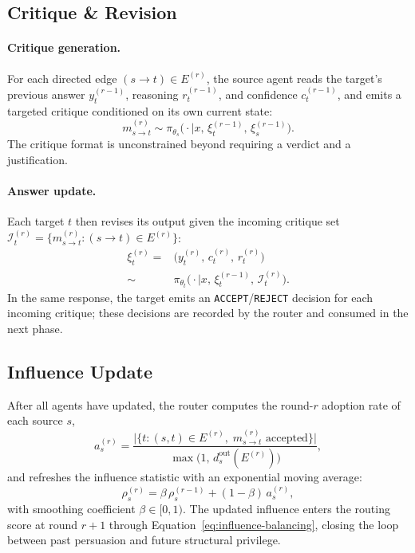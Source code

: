 \subsection{Critique \& Revision}
\label{sec:method:critique}
 
\paragraph{Critique generation.}
For each directed edge $(s\!\to\!t)\in E^{(r)}$, the source agent reads the target's previous answer $y_t^{(r-1)}$, reasoning $r_t^{(r-1)}$, and confidence $c_t^{(r-1)}$, and emits a targeted critique conditioned on its own current state:
\begin{equation*}
    m_{s\to t}^{(r)}\sim\pi_{\theta_s}\big(\cdot\mid x,\,\xi_t^{(r-1)},\,\xi_s^{(r-1)}\big).
\end{equation*}
The critique format is unconstrained beyond requiring a verdict and a justification.
 
\paragraph{Answer update.}
Each target $t$ then revises its output given the incoming critique set $\mathcal{I}_t^{(r)}=\{m_{s\to t}^{(r)}:(s\!\to\!t)\in E^{(r)}\}$:
\begin{align*}
    \xi_t^{(r)}=&\big(y_t^{(r)},\,c_t^{(r)},\,r_t^{(r)}\big)\\
    \sim&\pi_{\theta_t}\big(\cdot\mid x,\,\xi_t^{(r-1)},\,\mathcal{I}_t^{(r)}\big).
\end{align*}
In the same response, the target emits an \texttt{ACCEPT}/\texttt{REJECT} decision for each incoming critique; these decisions are recorded by the router and consumed in the next phase.
 
\subsection{Influence Update}
\label{sec:method:influence}
 
After all agents have updated, the router computes the round-$r$ adoption rate of each source $s$,
\begin{equation*}
    a_s^{(r)}
    =
    \frac{\big|\{t:(s,t)\in E^{(r)},\;m_{s\to t}^{(r)}\text{ accepted}\}\big|}
         {\max\big(1,\,d^{\mathrm{out}}_s(E^{(r)})\big)},
\end{equation*}
and refreshes the influence statistic with an exponential moving average:
\begin{equation}
    \rho_s^{(r)}=\beta\,\rho_s^{(r-1)}+(1-\beta)\,a_s^{(r)},
    \label{eq:influence-update}
\end{equation}
with smoothing coefficient $\beta\in[0,1)$. The updated influence enters the routing score at round $r{+}1$ through Equation~\eqref{eq:influence-balancing}, closing the loop between past persuasion and future structural privilege.
 
